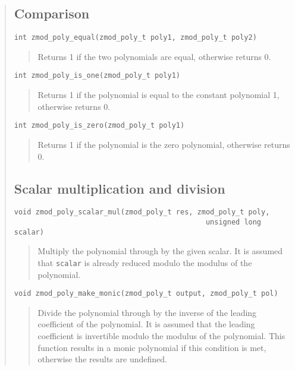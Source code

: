 \documentclass[a4paper,10pt]{article}
\newcommand{\code}{\lstinline}
\begin{document}
\begin{quote}
\subsection{Comparison}
\begin{lstlisting}
int zmod_poly_equal(zmod_poly_t poly1, zmod_poly_t poly2)
\end{lstlisting}
\begin{quote}
Returns 1 if the two polynomials are equal, otherwise returns 0.
\end{quote}

\begin{lstlisting}
int zmod_poly_is_one(zmod_poly_t poly1)
\end{lstlisting}
\begin{quote}
Returns 1 if the polynomial is equal to the constant polynomial 1, otherwise returns 0.
\end{quote}

\begin{lstlisting}
int zmod_poly_is_zero(zmod_poly_t poly1)
\end{lstlisting}
\begin{quote}
Returns 1 if the polynomial is the zero polynomial, otherwise returns 0. 
\end{quote}

\subsection{Scalar multiplication and division}
\begin{lstlisting}
void zmod_poly_scalar_mul(zmod_poly_t res, zmod_poly_t poly, 
                                             unsigned long scalar)
\end{lstlisting}
\begin{quote}
Multiply the polynomial through by the given scalar. It is assumed that \code{scalar} is already reduced modulo the modulus of the polynomial.
\end{quote}

\begin{lstlisting}
void zmod_poly_make_monic(zmod_poly_t output, zmod_poly_t pol)
\end{lstlisting}
\begin{quote}
Divide the polynomial through by the inverse of the leading coefficient of the polynomial. It is assumed that the leading coefficient is invertible modulo the modulus of the polynomial. This function results in a monic polynomial if this condition is met, otherwise the results are undefined.
\end{quote}


\end{quote}
\end{document}

